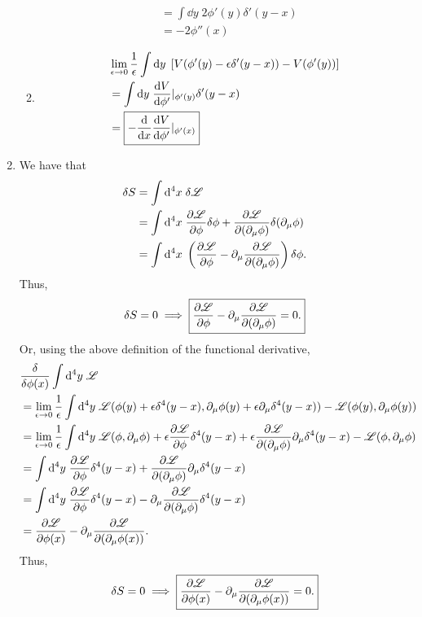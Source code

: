 \documentclass[12pt]{article}
\begin{document}
\begin{enumerate}[label=(\alph*)]
\begin{enumerate}[label=(\roman*)]
\begin{align*}
            &= \int \dd y\; 2\phi'(y)\delta'(y-x) \\
            &= \boxed{-2\phi''(x)}
        \end{align*}
        \item
        \begin{align*}
            &\lim_{\epsilon\to 0}\frac{1}{\epsilon}\int \dd y\; \left[V(\phi'(y) - \epsilon\delta'(y-x)) - V(\phi'(y))\right] \\
            &= \int \dd y\; \dv{V}{\phi'}|_{\phi'(y)}\delta'(y-x) \\
            &= \boxed{-\dv{x}\dv{V}{\phi'}|_{\phi'(x)}}
        \end{align*}
    \end{enumerate}

    \item We have that
    \begin{align*}
        \delta S &= \int\dd^4x\; \delta\mathscr{L} \\
        &= \int \dd^4x\; \pdv{\mathscr{L}}{\phi}\delta\phi + \pdv{\mathscr{L}}{(\partial_\mu\phi)}\delta(\partial_\mu\phi) \\
        &= \int \dd^4x\; \left(\pdv{\mathscr{L}}{\phi} - \partial_\mu\pdv{\mathscr{L}}{(\partial_\mu\phi)}\right)\delta\phi.
    \end{align*}
    Thus,
    \[ \delta S = 0 \implies \boxed{\pdv{\mathscr{L}}{\phi} - \partial_\mu\pdv{\mathscr{L}}{(\partial_\mu\phi)} = 0.} \]
    Or, using the above definition of the functional derivative,
    \begin{align*}
        & \frac{\delta}{\delta\phi(x)} \int\dd^4y\;\mathscr{L} \\
        &= \lim_{\epsilon\to 0}\frac{1}{\epsilon}\int\dd^4y\; \mathscr{L}(\phi(y) + \epsilon\delta^4(y-x), \partial_\mu\phi(y) + \epsilon\partial_\mu\delta^4(y-x)) - \mathscr{L}(\phi(y), \partial_\mu\phi(y)) \\
        &= \lim_{\epsilon\to 0}\frac{1}{\epsilon}\int\dd^4y\; \mathscr{L}(\phi,\partial_\mu\phi) + \epsilon\pdv{\mathscr{L}}{\phi}\delta^4(y-x) + \epsilon\pdv{\mathscr{L}}{(\partial_\mu\phi)}\partial_\mu\delta^4(y-x) - \mathscr{L}(\phi, \partial_\mu\phi) \\
        &= \int\dd^4y\; \pdv{\mathscr{L}}{\phi}\delta^4(y-x) + \pdv{\mathscr{L}}{(\partial_\mu\phi)}\partial_\mu\delta^4(y-x) \\
        &= \int\dd^4y\; \pdv{\mathscr{L}}{\phi}\delta^4(y-x) -  \partial_\mu\pdv{\mathscr{L}}{(\partial_\mu\phi)}\delta^4(y-x) \\
        &= \pdv{\mathscr{L}}{\phi(x)} - \partial_\mu\pdv{\mathscr{L}}{(\partial_\mu\phi(x))}.
    \end{align*}
    Thus,
    \[ \delta S = 0 \implies \boxed{\pdv{\mathscr{L}}{\phi(x)} - \partial_\mu\pdv{\mathscr{L}}{(\partial_\mu\phi(x))} = 0.} \]
\end{enumerate}
\end{document}

